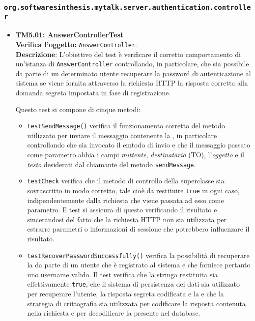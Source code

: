 \subsubsection{\texttt{org.softwaresinthesis.mytalk.server.authentication.controller}}
\begin{itemize}

\item \textbf{TM5.01: AnswerControllerTest}\\
\textbf{Verifica l'oggetto:} \texttt{AnswerController}.\\
\textbf{Descrizione}: L'obiettivo del test è verificare il corretto comportamento di un'istanza di \texttt{AnswerController} controllando, in particolare, che sia possibile da parte di un determinato utente recuperare la password di autenticazione al sistema se viene fornita attraverso la richiesta HTTP la risposta corretta alla domanda segreta impostata in fase di registrazione.

Questo test si compone di cinque metodi:
\begin{itemize}

\item \texttt{testSendMessage()} verifica il funzionamento corretto del metodo utilizzato per inviare il messaggio contenente la , in particolare controllando che sia invocato il emtodo di invio e che il messaggio passato come parametro abbia i campi \textit{mittente}, \textit{destinatario} (TO), l'\textit{oggetto} e il \textit{testo} desiderati dal chiamante del metodo \texttt{sendMessage}.

\item \texttt{testCheck} verifica che il metodo di controllo della superclasse sia sovrascritto in modo corretto, tale cioè da restituire \texttt{true} in ogni caso, indipendentemente dalla richiesta che viene passata ad esso come parametro. Il test si assicura di questo verificando il risultato e sincerandosi del fatto che la richiesta HTTP non sia utilizzata per estrarre parametri o informazioni di sessione che potrebbero influenzare il risultato.

\item \texttt{testRecoverPasswordSuccessfully()} verifica la possibilità di recuperare la  da parte di un utente che è registrato al sistema e che fornisce pertanto uno username valido. Il test verifica che la stringa restituita sia effettivamente \texttt{true}, che il sistema di persistenza dei dati sia utilizzato per recuperare l'utente, la risposta segreta codificata e la  e che la strategia di crittografia sia utilizzata per codificare la risposta contenuta nella richiesta e per decodificare la  presente nel database.


\end{itemize}
\end{itemize}

